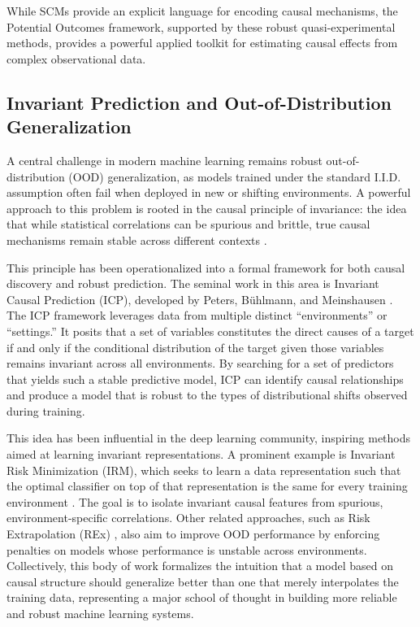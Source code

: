 {While SCMs provide an explicit language for encoding causal mechanisms, the Potential Outcomes framework, supported by these robust quasi-experimental methods, provides a powerful applied toolkit for estimating causal effects from complex observational data.

\subsection{Invariant Prediction and Out-of-Distribution Generalization}

A central challenge in modern machine learning remains robust out-of-distribution (OOD) generalization, as models trained under the standard I.I.D. assumption often fail when deployed in new or shifting environments. A powerful approach to this problem is rooted in the causal principle of invariance: the idea that while statistical correlations can be spurious and brittle, true causal mechanisms remain stable across different contexts \cite{pearl2000causality}.

This principle has been operationalized into a formal framework for both causal discovery and robust prediction. The seminal work in this area is Invariant Causal Prediction (ICP), developed by Peters, Bühlmann, and Meinshausen \cite{peters2016invariant}. The ICP framework leverages data from multiple distinct ``environments'' or ``settings.'' It posits that a set of variables constitutes the direct causes of a target if and only if the conditional distribution of the target given those variables remains invariant across all environments. By searching for a set of predictors that yields such a stable predictive model, ICP can identify causal relationships and produce a model that is robust to the types of distributional shifts observed during training.

This idea has been influential in the deep learning community, inspiring methods aimed at learning invariant representations. A prominent example is Invariant Risk Minimization (IRM), which seeks to learn a data representation such that the optimal classifier on top of that representation is the same for every training environment \cite{arjovsky2019invariant}. The goal is to isolate invariant causal features from spurious, environment-specific correlations. Other related approaches, such as Risk Extrapolation (REx) \cite{krueger2021out}, also aim to improve OOD performance by enforcing penalties on models whose performance is unstable across environments. Collectively, this body of work formalizes the intuition that a model based on causal structure should generalize better than one that merely interpolates the training data, representing a major school of thought in building more reliable and robust machine learning systems.

}
